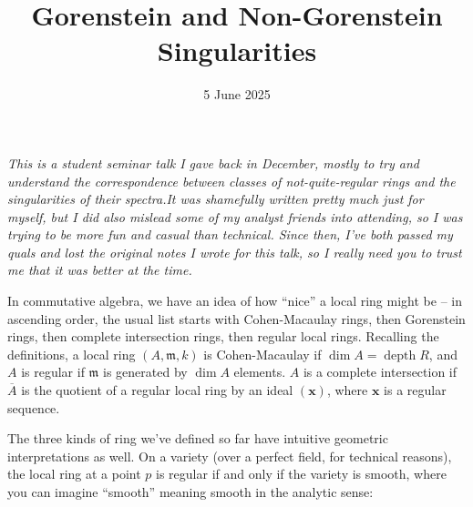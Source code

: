 \documentclass[11pt]{article}
\title{Gorenstein and Non-Gorenstein Singularities}
\date{5 June 2025}
\newcommand{\BExcerpt}{}
\newcommand{\EExcerpt}{}
\DeclareMathOperator{\depth}{depth}
\begin{document}
    \maketitle
    {\itshape\BExcerpt This is a student seminar talk I gave back in December, mostly to try and understand the correspondence between classes of not-quite-regular rings and the singularities of their spectra.\EExcerpt It was shamefully written pretty much just for myself, but I did also mislead some of my analyst friends into attending, so I was trying to be more fun and casual than technical. Since then, I've both passed my quals and lost the original notes I wrote for this talk, so I really need you to trust me that it was better at the time.}

    In commutative algebra, we have an idea of how ``nice'' a local ring might be -- in ascending order, the usual list starts with Cohen-Macaulay rings, then Gorenstein rings, then complete intersection rings, then regular local rings. Recalling the definitions, a local ring \((A, \mathfrak{m}, k)\) is Cohen-Macaulay if \(\dim A = \depth R\), and \(A\) is regular if \(\mathfrak{m}\) is generated by \(\dim A\) elements. \(A\) is a complete intersection if \(\overline{A}\) is the quotient of a regular local ring by an ideal \((\boldsymbol{x})\), where \(\boldsymbol{x}\) is a regular sequence. 
    
    The three kinds of ring we've defined so far have intuitive geometric interpretations as well. On a variety (over a perfect field, for technical reasons), the local ring at a point \(p\) is regular if and only if the variety is smooth, where you can imagine ``smooth'' meaning smooth in the analytic sense:
\end{document}
